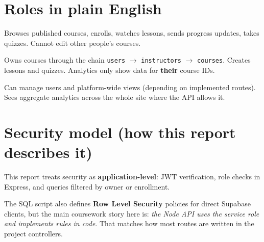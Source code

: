 \section{Roles in plain English}
\begin{description}[style=nextline]
  \item[Student]
  Browses published courses, enrolls, watches lessons, sends progress updates, takes quizzes. Cannot edit other people's courses.

  \item[Instructor]
  Owns courses through the chain \texttt{users} $\rightarrow$ \texttt{instructors} $\rightarrow$ \texttt{courses}. Creates lessons and quizzes. Analytics only show data for \textbf{their} course IDs.

  \item[Admin]
  Can manage users and platform-wide views (depending on implemented routes). Sees aggregate analytics across the whole site where the API allows it.
\end{description}

\section{Security model (how this report describes it)}
This report treats security as \textbf{application-level}: JWT verification, role checks in Express, and queries filtered by owner or enrollment.

The SQL script also defines \textbf{Row Level Security} policies for direct Supabase clients, but the main coursework story here is: \textit{the Node API uses the service role and implements rules in code}. That matches how most routes are written in the project controllers.
